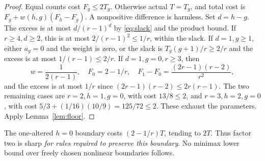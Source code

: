 \documentclass[11pt]{article}
\theoremstyle{definition}\newtheorem{definition}[theorem]{Definition}
\theoremstyle{remark}\newtheorem{remark}[theorem]{Remark}
\begin{document}
\begin{proof}
Equal counts cost $F_g\le2T_g$. Otherwise actual $T=T_g$, and total cost is
$F_g+w(h,g)(F_h-F_g)$. A nonpositive difference is harmless. Set $d=h-g$.
The excess is at most $d/(r-1)^d$ by \eqref{eq:slack} and the product bound.
If $r\ge4,d\ge2$, this is at most $2/(r-1)^2\le1/r$, within the slack.
If $d=1,g\ge1$, either $a_g=0$ and the weight is zero, or the slack is
$T_g(g+1)/r\ge2/r$ and the excess is at most $1/(r-1)\le2/r$.
If $d=1,g=0,r\ge3$, then
\[
 w=\frac1{2(r-1)},\quad F_0=2-1/r,\quad
 F_1-F_0=\frac{(2r-1)(r-2)}{r^2},
\]
and the excess is at most $1/r$ since
$(2r-1)(r-2)\le2r(r-1)$.
The two remaining cases are $r=2,h=1,g=0$, with cost $13/8\le2$, and
$r=3,h=2,g=0$, with cost
$5/3+(1/16)(10/9)=125/72\le2$. These exhaust the parameters.
Apply Lemma~\ref{lem:floor}.
\end{proof}
The one-altered $h=0$ boundary costs $(2-1/r)T$, tending to $2T$.
Thus factor two is sharp \emph{for rules required to preserve this boundary}.
No minimax lower bound over freely chosen nonlinear boundaries follows.
\end{document}
